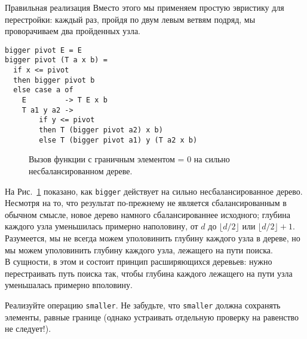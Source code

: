 \begin{frame}[fragile]{Правильная реализация  }
Вместо этого мы применяем простую
эвристику для перестройки: каждый раз, пройдя по двум левым ветвям
подряд, мы проворачиваем два пройденных узла.

\begin{verbatim}
bigger pivot E = E
bigger pivot (T a x b) =
  if x <= pivot 
  then bigger pivot b
  else case a of
    E         -> T E x b
    T a1 y a2 ->
        if y <= pivot 
        then T (bigger pivot a2) x b)
        else T (bigger pivot a1) y (T a2 x b)
\end{verbatim} 
\end{frame}

\begin{frame}[fragile]{}
\begin{figure}
  \centering
  
  \caption{Вызов функции  с граничным элементом  = 0 на сильно несбалансированном дереве.}
  \label{fig:5.4}
\end{figure}


\end{frame}

\begin{frame}[fragile]{}
На Рис.~\ref{fig:5.4} показано, как \lstinline!bigger! действует на
сильно несбалансированное дерево. \\

Несмотря на то, что результат
по-прежнему не является сбалансированным в обычном смысле, новое
дерево намного сбалансированнее исходного; глубина каждого узла
уменьшилась примерно наполовину, от $d$ до $\lfloor d/2 \rfloor$ или
$\lfloor d/2 \rfloor + 1$.\\

Разумеется, мы не всегда можем уполовинить
глубину каждого узла в дереве, но мы можем уполовинить глубину каждого
узла, лежащего на пути поиска. \\

В сущности, в этом и состоит принцип
расширяющихся деревьев: нужно перестраивать путь поиска так, чтобы
глубина каждого лежащего на пути узла уменьшалась примерно вполовину.
\end{frame}

\ifanswers
\begin{frame}[fragile]{}
\begin{exercise}\label{ex:5.4}
  Реализуйте операцию \lstinline!smaller!. Не забудьте, что
  \lstinline!smaller! должна сохранять элементы, равные границе (однако
  устраивать отдельную проверку на равенство не следует!).
\end{exercise}
\end{frame}
\fi 


